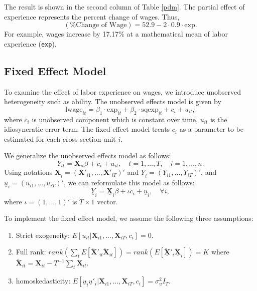 \documentclass[
  12pt,
]{article}
\providecommand{\tightlist}{%
  \setlength{\itemsep}{0pt}\setlength{\parskip}{0pt}}
\begin{document}
The result is shown in the second column of Table \ref{pdm}.
The partial effect of experience represents the percent change of wages.
Thus,
\[
  (\text{\% Change of Wage}) = 52.9 - 2 \cdot 0.9 \cdot \text{exp}.
\]
For example, wages increase by 17.17\% at a mathematical mean of labor experience (\texttt{exp}).

\hypertarget{fixed-effect-model}{%
\subsection{Fixed Effect Model}\label{fixed-effect-model}}

To examine the effect of labor experience on wages,
we introduce unobserved heterogeneity such as ability.
The unobserved effects model is given by
\[
  \text{lwage}_{it} = 
  \beta_1 \cdot \text{exp}_{it} +
  \beta_2 \cdot \text{sqexp}_{it} + 
  c_i + u_{it},
\]
where \(c_i\) is unobserved component which is constant over time,
\(u_{it}\) is the idiosyncratic error term.
The fixed effect model treats \(c_i\) as a parameter to be estimated for each cross section unit \(i\).

We generalize the unobserved effects model as follows:
\[
  Y_{it} = \mathbf{X}_{it} \beta + c_i + u_{it}, \quad t = 1, \ldots, T, \quad i = 1, \ldots, n.
\]
Using notations \(\underline{\mathbf{X}}_i = (\mathbf{X}'_{i1}, \ldots, \mathbf{X}'_{iT})'\)
and \(\underline{Y}_i = (Y_{i1}, \ldots, Y_{iT})'\), and \(\underline{u}_i = (u_{i1}, \ldots, u_{iT})'\),
we can reformulate this model as follows:
\[
  \underline{Y}_i = \underline{\mathbf{X}}_i \beta + \iota c_i + \underline{u}_i, \quad \forall i,
\]
where \(\iota = (1, \ldots, 1)'\) is \(T \times 1\) vector.

To implement the fixed effect model,
we assume the following three assumptions:

\begin{enumerate}
\def\labelenumi{\arabic{enumi}.}
\tightlist
\item
  Strict exogeneity: \(E[u_{it} | \mathbf{X}_{i1}, \ldots, \mathbf{X}_{iT}, c_i] = 0\).
\item
  Full rank: \(rank(\sum_t E[\ddot{\mathbf{X}}'_{it}\ddot{\mathbf{X}}_{it}]) = rank(E[\ddot{\underline{\mathbf{X}}}'_i\ddot{\underline{\mathbf{X}}}_i]) = K\) where \(\ddot{\mathbf{X}}_{it} = \mathbf{X}_{it} - T^{-1}\sum_t \mathbf{X}_{it}\).
\item
  homoskedasticity: \(E[\underline{u}_i \underline{u}'_i|\mathbf{X}_{i1}, \ldots, \mathbf{X}_{iT}, c_i] = \sigma^2_u I_T\).
\end{enumerate}
\end{document}
